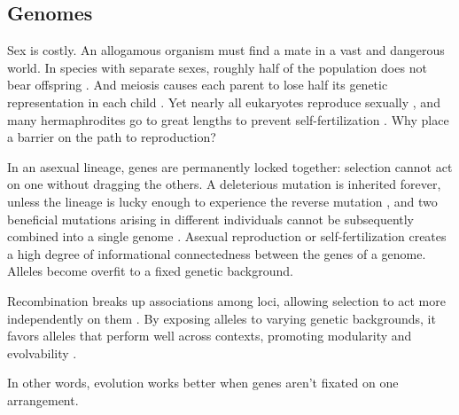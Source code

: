 \documentclass[11pt]{article}
\begin{document}
\subsection{Genomes} 

Sex is costly. An allogamous organism must find a mate in a vast and dangerous world. In species with separate sexes, roughly half of the population does not bear offspring \citep{smith1971origin}. And meiosis causes each parent to lose half its genetic representation in each child \citep{williams1975sex}. Yet nearly all eukaryotes reproduce sexually \citep{speijer2015sex}, and many hermaphrodites go to great lengths to prevent self-fertilization \citep{charlesworth2005plant}. Why place a barrier on the path to reproduction? 

In an asexual lineage, genes are permanently locked together: selection cannot act on one without dragging the others. A deleterious mutation is inherited forever, unless the lineage is lucky enough to experience the reverse mutation \citep{muller1964relation}, and two beneficial mutations arising in different individuals cannot be subsequently combined into a single genome \citep{muller1932some,fisher1930genetical}. Asexual reproduction or self-fertilization creates a high degree of informational connectedness between the genes of a genome. Alleles become overfit to a fixed genetic background. 

Recombination breaks up associations among loci, allowing selection to act more independently on them \citep{felsenstein1974evolutionary}. By exposing alleles to varying genetic backgrounds, it favors alleles that perform well across contexts, promoting modularity and evolvability \citep{livnat2008mixability,livnat2010sex,wagner1996perspective, watson2016can}.

In other words, evolution works better when genes aren't fixated on one arrangement. 



\end{document}
